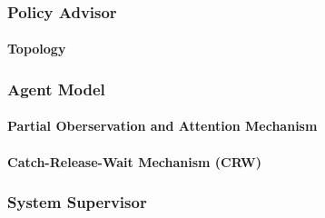 \documentclass{article}
\begin{document}
	\subsubsection{Policy Advisor}

	\paragraph{Topology}



	\subsubsection{Agent Model}

	\paragraph{Partial Oberservation and Attention Mechanism}

	\paragraph{Catch-Release-Wait Mechanism (CRW)}

	\subsubsection{System Supervisor}
\end{document}
